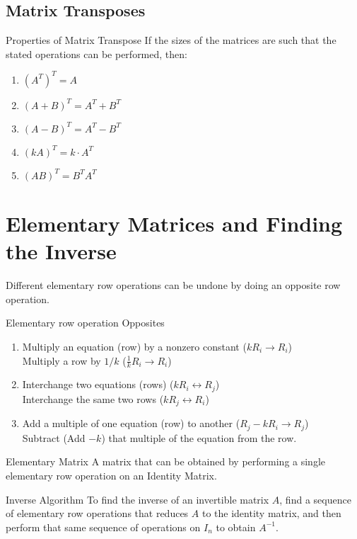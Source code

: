 \documentclass[\main/notes.tex]{subfiles}
\begin{document}
			\subsection{Matrix Transposes}
				\begin{sidenote}{Properties of Matrix Transpose}
					If the sizes of the matrices are such that the stated operations can be performed, then:
					\begin{enumerate}[label=(\alph*)]
						\item $(A^{T})^{T} = A$
						\item $(A + B)^{T} = A^{T} + B^{T}$
						\item $(A - B)^{T} = A^{T} - B^{T}$
						\item $(kA)^{T} = k \cdot A^{T}$
						\item $(AB)^{T} = B^{T}A^{T}$
					\end{enumerate}
				\end{sidenote}

		\section[Elementary Matrices]{Elementary Matrices and Finding the Inverse}
			Different elementary row operations can be undone by doing an opposite row operation.
			\begin{sidenote}{Elementary row operation Opposites}
				\begin{enumerate}
					\item Multiply an equation (row) by a nonzero constant ($kR_{i} \rightarrow R_{i}$)\\
						Multiply a row by $1/k$ ($\frac{1}{k}R_{i} \rightarrow R_{i}$)
					\item Interchange two equations (rows) ($kR_{i} \leftrightarrow R_{j}$)\\
						Interchange the same two rows ($kR_{j} \leftrightarrow R_{i}$)
					\item Add a multiple of one equation (row) to another ($R_{j} - kR_{i} \rightarrow R_{j}$)\\
						Subtract (Add $-k$) that multiple of the equation from the row. 
				\end{enumerate}
			\end{sidenote}
			\begin{definition}{Elementary Matrix}
				A matrix that can be obtained by performing a single elementary row operation on an Identity Matrix.
			\end{definition}
			\begin{theorem}{Inverse Algorithm}
				To find the inverse of an invertible matrix $A$, find a sequence of elementary row operations that reduces $A$ to the identity matrix, and then perform that same sequence of operations on $I_{n}$ to obtain $A^{-1}$.
			\end{theorem}
\end{document}
